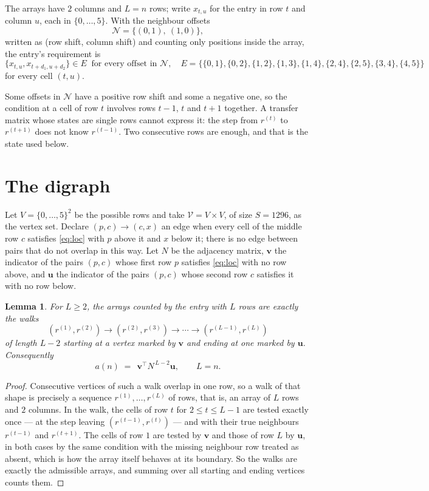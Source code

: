 \documentclass[11pt,a4paper]{article}
\theoremstyle{plain}
\newtheorem{lemma}[theorem]{Lemma}
\theoremstyle{definition}
\begin{document}
The arrays have $2$ columns and $L=n$ rows; write $x_{t,u}$ for the entry in
row $t$ and column $u$, each in $\{0,\dots,5\}$. With the neighbour offsets
\[
\mathcal N=\{(0,1),\ (1,0)\},
\]
written as (row shift, column shift) and counting only positions inside the array, the
entry's requirement is
\begin{equation}\label{eq:loc}
\{x_{t,u},x_{t+d_1,u+d_2}\}\in E\ \text{ for every offset in }\mathcal N,\quad E=\{\{0,1\},\{0,2\},\{1,2\},\{1,3\},\{1,4\},\{2,4\},\{2,5\},\{3,4\},\{4,5\}\}
\end{equation}
for every cell $(t,u)$.

Some offsets in $\mathcal N$ have a positive row shift and some a negative one, so the
condition at a cell of row $t$ involves rows $t-1$, $t$ and $t+1$ together. A transfer
matrix whose states are single rows cannot express it: the step from $r^{(t)}$ to
$r^{(t+1)}$ does not know $r^{(t-1)}$. Two consecutive rows are enough, and that is
the state used below.

\section{The digraph}

Let $V=\{0,\dots,5\}^{2}$ be the possible rows and take
$\mathcal V=V\times V$, of size $S=1296$, as the vertex set. Declare $(p,c)\to(c,x)$ an edge
when every cell of the middle row $c$ satisfies \eqref{eq:loc} with $p$ above it and $x$
below it; there is no edge between pairs that do not overlap in this way. Let $N$ be the
adjacency matrix, $\mathbf{v}$ the indicator of the pairs $(p,c)$ whose first row $p$
satisfies \eqref{eq:loc} with no row above, and $\mathbf{u}$ the indicator of
the pairs $(p,c)$ whose second row $c$ satisfies it with no row below.

\begin{lemma}\label{lem:walk}
For $L\ge2$, the arrays counted by the entry with $L$ rows are exactly the walks
\[
(r^{(1)},r^{(2)})\to(r^{(2)},r^{(3)})\to\cdots\to(r^{(L-1)},r^{(L)})
\]
of length $L-2$ starting at a vertex marked by $\mathbf{v}$ and ending at one marked by
$\mathbf{u}$. Consequently
\[
a(n)\;=\;\,\mathbf{v}^{\!\top}N^{\,L-2}\mathbf{u},\qquad L=n .
\]
\end{lemma}

\begin{proof}
Consecutive vertices of such a walk overlap in one row, so a walk of that shape is
precisely a sequence $r^{(1)},\dots,r^{(L)}$ of rows, that is, an array of $L$ rows
and $2$ columns. In the walk, the cells of row $t$ for $2\le t\le L-1$ are tested
exactly once --- at the step leaving $(r^{(t-1)},r^{(t)})$ --- and with their true
neighbours $r^{(t-1)}$ and $r^{(t+1)}$. The cells of row $1$ are tested by
$\mathbf{v}$ and those of row $L$ by $\mathbf{u}$, in both cases by the same condition
with the missing neighbour row treated as absent, which is how the array itself behaves at
its boundary. So the walks are exactly the admissible arrays, and summing over all starting
and ending vertices counts them.
\end{proof}
\end{document}
